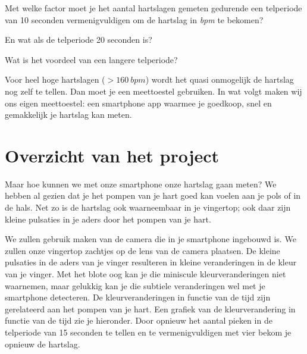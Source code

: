 \begin{oef}
	Met welke factor moet je het aantal hartslagen gemeten gedurende een telperiode van 10 seconden vermenigvuldigen om de hartslag in \emph{bpm} te bekomen? 
	
	En wat als de telperiode 20 seconden is?
	
	Wat is het voordeel van een langere telperiode?
\end{oef}

Voor heel hoge hartslagen ($>160~bpm$) wordt het quasi onmogelijk de hartslag nog zelf te tellen. Dan moet je een meettoestel gebruiken. In wat volgt maken wij ons eigen meettoestel: een smartphone app waarmee je goedkoop, snel en gemakkelijk je hartslag kan meten.

\section{Overzicht van het project}
\label{sec:Mod1_Sec3}

Maar hoe kunnen we met onze smartphone onze hartslag gaan meten? We hebben al gezien dat je het pompen van je hart goed kan voelen aan je pols of in de hals. Net zo is de hartslag ook waarneembaar in je vingertop; ook daar zijn kleine pulsaties in je aders door het pompen van je hart. 


We zullen gebruik maken van de camera die in je smartphone ingebouwd is. We zullen onze vingertop zachtjes op de lens van de camera plaatsen. De kleine pulsaties in de aders van je vinger resulteren in kleine veranderingen in de kleur van je vinger. Met het blote oog kan je die miniscule kleurveranderingen niet waarnemen, maar gelukkig kan je die subtiele veranderingen wel met je smartphone detecteren. De kleurveranderingen in functie van de tijd zijn gerelateerd aan het pompen van je hart. Een grafiek van de kleurverandering in functie van de tijd zie je hieronder. Door opnieuw het aantal pieken in de telperiode van 15 seconden te tellen en te vermenigvuldigen met vier bekom je opnieuw de hartslag.

